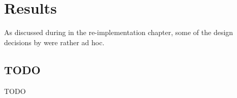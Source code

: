\chapter{Results}
\label{ch:results}

As discussed during in the re-implementation chapter, some of the design decisions by \citet{deBoer2000} were rather ad hoc.



\section{TODO}
\label{sec:results_XXX}

TODO